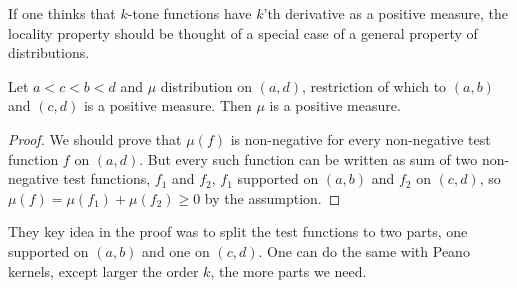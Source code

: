 If one thinks that $k$-tone functions have $k$'th derivative as a positive measure, the locality property should be thought of a special case of a general property of distributions.
\begin{prop}
	Let $a < c < b < d$ and $\mu$ distribution on $(a, d)$, restriction of which to $(a, b)$ and $(c, d)$ is a positive measure. Then $\mu$ is a positive measure.
\end{prop}
\begin{proof}
	We should prove that $\mu(f)$ is non-negative for every non-negative test function $f$ on $(a, d)$. But every such function can be written as sum of two non-negative test functions, $f_{1}$ and $f_{2}$, $f_{1}$ supported on $(a, b)$ and $f_{2}$ on $(c, d)$, so $\mu(f) = \mu(f_{1}) + \mu(f_{2}) \geq 0$ by the assumption.
\end{proof}

They key idea in the proof was to split the test functions to two parts, one supported on $(a, b)$ and one on $(c, d)$. One can do the same with Peano kernels, except larger the order $k$, the more parts we need. 

